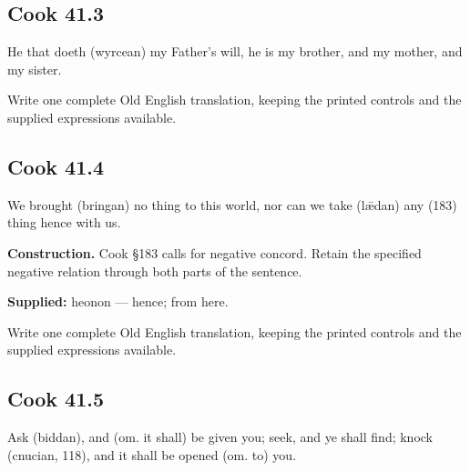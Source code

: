 \par\begin{minipage}{\linewidth}\raggedright
\subsection*{Cook 41.3}

He that doeth (wyrcean) my Father’s will, he is my brother, and my mother, and my sister.

Write one complete Old English translation, keeping the printed controls and the supplied expressions available.

\end{minipage}\par\addvspace{4pt}

\par\begin{minipage}{\linewidth}\raggedright
\subsection*{Cook 41.4}

We brought (bringan) no thing to this world, nor can we take (lǣdan) any (183) thing hence with us.

\textbf{Construction.} Cook §183 calls for negative concord. Retain the specified negative relation through both parts of the sentence.

\end{minipage}\par\addvspace{4pt}

\textbf{Supplied:} heonon — hence; from here.

Write one complete Old English translation, keeping the printed controls and the supplied expressions available.

\par\begin{minipage}{\linewidth}\raggedright
\subsection*{Cook 41.5}

Ask (biddan), and (om. it shall) be given you; seek, and ye shall find; knock (cnucian, 118), and it shall be opened (om. to) you.

\end{minipage}\par\addvspace{4pt}

